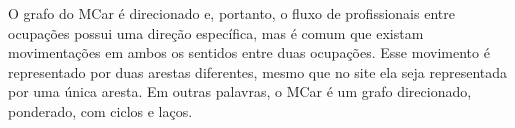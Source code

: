 \documentclass[12pt,a4paper]{article}
\newcommand{\source}[1]{\vspace{-10pt} \caption*{Fonte: {#1}} }
\begin{document}
O grafo do MCar é direcionado e, portanto, o fluxo de profissionais entre ocupações possui uma direção específica, mas é comum que existam movimentações em ambos os sentidos entre duas ocupações. Esse movimento é representado por duas arestas diferentes, mesmo que no site ela seja representada por uma única aresta. Em outras palavras, o MCar é um grafo direcionado, ponderado, com ciclos e laços.

\end{document}
